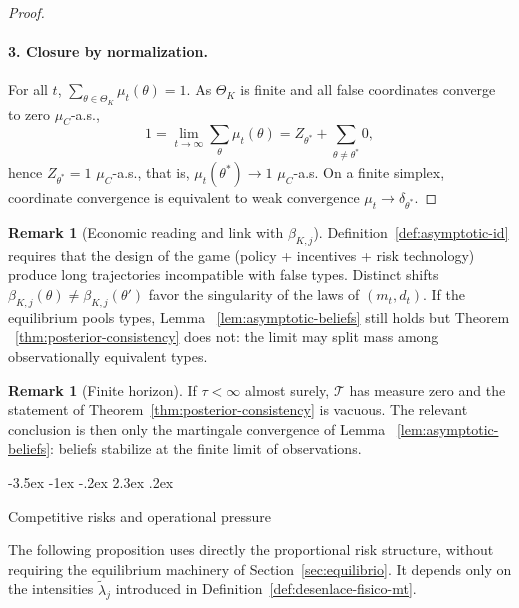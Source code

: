 \documentclass[12pt]{article}
\makeatletter
\numberwithin{equation}{section}
\numberwithin{table}{section}
\theoremstyle{definition}
\newtheorem{remark}[theorem]{Remark}
\renewcommand\section{\@startsection {section}{1}{\z@}%
                                   {-3.5ex \@plus -1ex \@minus -.2ex}%
                                   {2.3ex \@plus.2ex}%
                                   {\normalfont\Large\bfseries\raggedright}}
\makeatother
\begin{document}
\begin{proof}
\paragraph{3. Closure by normalization.}
For all $t$, $\sum_{\theta\in\Theta_K}\mu_t(\theta)=1$. As $\Theta_K$ is
finite and all false coordinates converge to zero $\mu_C$-a.s.,
\[
1=\lim_{t\to\infty}\sum_\theta\mu_t(\theta)
=Z_{\theta^\ast}+\sum_{\theta\neq\theta^\ast}0,
\]
hence $Z_{\theta^\ast}=1$ $\mu_C$-a.s., that is,
$\mu_t(\theta^\ast)\to 1$ $\mu_C$-a.s. On a finite simplex, coordinate
convergence is equivalent to weak convergence $\mu_t\to\delta_{\theta^\ast}$.
\end{proof}

\begin{remark}[Economic reading and link with $\beta_{K,j}$]
\label{rem:lectura-beta}
Definition~\ref{def:asymptotic-id} requires that the design of the game
(policy + incentives + risk technology) produce long trajectories incompatible
with false types. Distinct shifts
$\beta_{K,j}(\theta)\neq\beta_{K,j}(\theta')$ favor the singularity of
the laws of $(m_t,d_t)$. If the equilibrium pools types, Lemma
~\ref{lem:asymptotic-beliefs} still holds but Theorem
~\ref{thm:posterior-consistency} does not: the limit may split mass among
observationally equivalent types.
\end{remark}

\begin{remark}[Finite horizon]
\label{rmk:horizonte-finito}
If $\tau<\infty$ almost surely, $\mathcal{T}$ has measure zero and the
statement of Theorem~\ref{thm:posterior-consistency} is vacuous. The relevant
conclusion is then only the martingale convergence of Lemma
~\ref{lem:asymptotic-beliefs}: beliefs stabilize at the finite limit of
observations.
\end{remark}

\section{Competitive risks and operational pressure}
\label{sec:riesgos}

\noindent The following proposition uses directly the proportional risk
structure, without requiring the equilibrium machinery of
Section~\ref{sec:equilibrio}. It depends only on the intensities
$\tilde\lambda_j$ introduced in Definition~\ref{def:desenlace-fisico-mt}.
\end{document}
